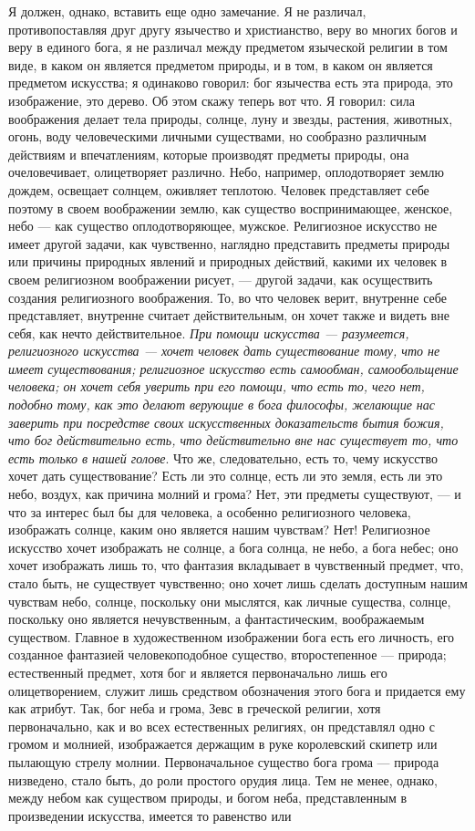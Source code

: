 \documentclass[12pt]{article}
\begin{document}
Я должен, однако, вставить еще одно замечание. Я не различал, противопоставляя друг другу язычество и христианство, веру во многих богов и веру в единого бога, я не различал между предметом языческой религии в том виде, в каком он является предметом природы, и в том, в каком он является предметом искусства; я одинаково говорил: бог язычества есть эта природа, это изображение, это дерево. Об этом скажу теперь вот что. Я говорил: сила воображения делает тела природы, солнце, луну и звезды, растения, животных, огонь, воду человеческими личными существами, но сообразно различным действиям и впечатлениям, которые производят предметы природы, она очеловечивает, олицетворяет различно. Небо, например, оплодотворяет землю дождем, освещает солнцем, оживляет теплотою. Человек представляет себе поэтому в своем воображении землю, как существо воспринимающее, женское, небо --- как существо оплодотворяющее, мужское. Религиозное искусство не имеет другой задачи, как чувственно, наглядно представить предметы природы или причины природных явлений и природных действий, какими их человек в своем религиозном воображении рисует, --- другой задачи, как осуществить создания религиозного воображения. То, во что человек верит, внутренне себе представляет, внутренне считает действительным, он хочет также и видеть вне себя, как нечто действительное. \emph{При помощи искусства --- разумеется, религиозного искусства --- хочет человек дать существование тому, что не имеет существования; религиозное искусство есть самообман, самообольщение человека; он хочет себя уверить при его помощи, что есть то, чего нет, подобно тому, как это делают верующие в бога философы, желающие нас заверить при посредстве своих искусственных доказательств бытия божия, что бог действительно есть, что действительно вне нас существует то, что есть только в нашей голове}. Что же, следовательно, есть то, чему искусство хочет дать существование? Есть ли это солнце, есть ли это земля, есть ли это небо, воздух, как причина молний и грома? Нет, эти предметы существуют, --- и что за интерес был бы для человека, а особенно религиозного человека, изображать солнце, каким оно является нашим чувствам? Нет! Религиозное искусство хочет изображать не солнце, а бога солнца, не небо, а бога небес; оно хочет изображать лишь то, что фантазия вкладывает в чувственный предмет, что, стало быть, не существует чувственно; оно хочет лишь сделать доступным нашим чувствам небо, солнце, поскольку они мыслятся, как личные существа, солнце, поскольку оно является нечувственным, а фантастическим, воображаемым существом. Главное в художественном изображении бога есть его личность, его созданное фантазией человекоподобное существо, второстепенное --- природа; естественный предмет, хотя бог и является первоначально лишь его олицетворением, служит лишь средством обозначения этого бога и придается ему как атрибут. Так, бог неба и грома, Зевс в греческой религии, хотя первоначально, как и во всех естественных религиях, он представлял одно с громом и молнией, изображается держащим в руке королевский скипетр или пылающую стрелу молнии. Первоначальное существо бога грома --- природа низведено, стало быть, до роли простого орудия лица. Тем не менее, однако, между небом как существом природы, и богом неба, представленным в произведении искусства, имеется то равенство или 
\end{document}
